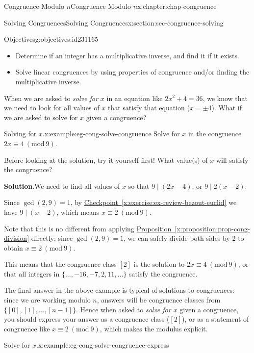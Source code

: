 \documentclass[oneside,10pt,]{book}
\newcommand{\blocktitlefont}{\relax}
\newcommand{\xreffont}{\relax}
\numberwithin{equation}{section}
\newcommand{\Mod}[1]{\ \left(\mathrm{mod}\ #1\right)}
\begin{document}
\begin{chapterptx}{Congruence Modulo \(n\)}{}{Congruence Modulo \(n\)}{}{}{x:chapter:chap-congruence}
\begin{sectionptx}{Solving Congruences}{}{Solving Congruences}{}{}{x:section:sec-congruence-solving}
\begin{objectives}{Objectives}{g:objectives:id231165}
%
\begin{itemize}[label=\textbullet]
\item{}Determine if an integer has a multiplicative inverse, and find it if it exists.%
\item{}Solve linear congruences by using properties of congruence and\slash{}or finding the multiplicative inverse.%
\end{itemize}
\end{objectives}
When we are asked to \emph{solve for \(x\)} in an equation like \(2x^2 + 4 = 36\), we know that we need to look for all values of \(x\) that satisfy that equation (\(x = \pm 4\)). What if we are asked to solve for \(x\) given a congruence?%
\begin{example}{Solving for \(x\).}{x:example:eg-cong-solve-congruence}%
Solve for \(x\) in the congruence \(2x \equiv 4 \Mod{9}\).%
\par
Before looking at the solution, try it yourself first! What value(s) of \(x\) will satisfy the congruence?%
\par\smallskip%
\noindent\textbf{\blocktitlefont Solution}.\hypertarget{g:solution:id244860}{}\quad{}We need to find all values of \(x\) so that \(9 \mid (2x - 4)\), or \(9 \mid 2(x-2)\).%
\par
Since \(\gcd(2,9) = 1\), by \hyperref[x:exercise:ex-review-bezout-euclid]{Checkpoint~{\xreffont\ref{x:exercise:ex-review-bezout-euclid}}} we have \(9 \mid (x-2)\), which means \(x \equiv 2 \Mod{9}\).%
\par
Note that this is no different from applying \hyperref[x:proposition:prop-cong-division]{Proposition~{\xreffont\ref{x:proposition:prop-cong-division}}} directly: since \(\gcd(2,9) = 1\), we can safely divide both sides by 2 to obtain \(x \equiv 2 \Mod{9}\).%
\par
This means that the congruence class \([2]\) is the solution to \(2x \equiv 4 \Mod{9}\), or that all integers in \(\{\ldots,-16,-7,2,11,\ldots\}\) satisfy the congruence.%
\end{example}
The final answer in the above example is typical of solutions to congruences: since we are working modulo \(n\), answers will be congruence classes from \(\{[0],[1],\ldots,[n-1]\}\). Hence when asked to \emph{solve for \(x\)} given a congruence, you should express your answer as a congruence class (\([2]\)), or as a statement of congruence like \(x \equiv 2 \Mod{9}\), which makes the modulus explicit.%
\begin{example}{Solve for \(x\).}{x:example:eg-cong-solve-congruence-express}%

\end{example}
\end{sectionptx}
\end{chapterptx}
\end{document}
